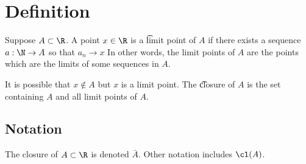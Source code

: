 
\section*{Definition}

Suppose $A \subset \R $.
A point $x \in \R $ is a \t{limit point} of $A$ if there exists a sequence $a: \N   \to A$ so that $a_n \to x$
In other words, the limit points of $A$ are the points which are the limits of some sequences in $A$.

It is possible that $x \not\in A$ but $x$ is a limit point.
The \t{closure} of $A$ is the set containing $A$ and all limit points of $A$.

\subsection*{Notation}

The closure of $A \subset \R $ is denoted $\bar{A}$.
Other notation includes $\cl(A)$.

\blankpage
